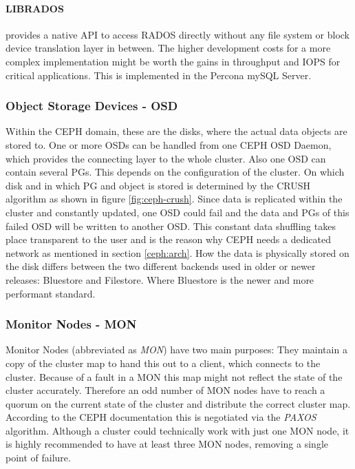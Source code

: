 \documentclass[titlepage, a4paper, 11pt]{scrartcl}
\begin{document}
                \paragraph{LIBRADOS} provides a native API to access RADOS directly without any file system or block device translation layer in
                between. The higher development costs for a more complex implementation might be worth the gains in throughput and IOPS
                for critical applications. This is implemented in the Percona mySQL Server\cite{redhatstudy}.

            \subsubsection{Object Storage Devices - OSD}

                Within the CEPH domain, these are the disks, where the actual data objects are stored to. 
                One or more OSDs can be handled from one CEPH OSD Daemon, which provides the connecting layer to the whole cluster.
                Also one OSD can contain several PGs. This depends on the configuration of the cluster. On which disk and in which PG
                and object is stored is determined by the CRUSH algorithm as shown in figure \ref{fig:ceph-crush}.
                Since data is replicated within the cluster and constantly updated, one OSD could fail and the data and PGs of this failed
                OSD will be written to another OSD. This constant data shuffling takes place transparent to the user and is the reason why CEPH
                needs a dedicated network as mentioned in section \ref{ceph:arch}. How the data is physically stored on the disk differs between
                the two different backends used in older or newer releases: Bluestore and Filestore. Where Bluestore is the newer and more performant standard.
            
            \subsubsection{Monitor Nodes - MON}

                Monitor Nodes (abbreviated as \textit{MON}) have two main purposes: They maintain a copy of the cluster map to hand this out 
                to a client, which connects to the cluster. Because of a fault in a MON this map might not reflect the state of the cluster accurately.
                Therefore an odd number of MON nodes have to reach a quorum on the current state of the cluster and distribute the correct cluster map.
                According to the CEPH documentation this is negotiated via the \textit{PAXOS} algorithm\cite{MONcephDocu}.
                Although a cluster could technically work with just one MON node, it is highly recommended to have at least three MON nodes,
                removing a single point of failure.
\end{document}
